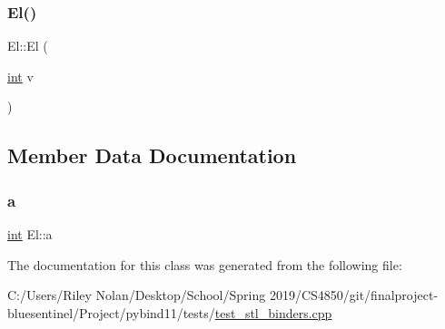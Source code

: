 \subsubsection{\texorpdfstring{El()}{El()}\hspace{0.1cm}{\footnotesize\ttfamily [2/2]}}
{\footnotesize\ttfamily El\+::\+El (\begin{DoxyParamCaption}\item[{\mbox{\hyperlink{warnings_8h_a74f207b5aa4ba51c3a2ad59b219a423b}{int}}}]{v }\end{DoxyParamCaption})\hspace{0.3cm}{\ttfamily [inline]}}



\subsection{Member Data Documentation}
\mbox{\label{class_el_a15afd3737e7710315fc5808f9188d0fe}} 
\subsubsection{\texorpdfstring{a}{a}}
{\footnotesize\ttfamily \mbox{\hyperlink{warnings_8h_a74f207b5aa4ba51c3a2ad59b219a423b}{int}} El\+::a}



The documentation for this class was generated from the following file\+:\begin{DoxyCompactItemize}
\item 
C\+:/\+Users/\+Riley Nolan/\+Desktop/\+School/\+Spring 2019/\+C\+S4850/git/finalproject-\/bluesentinel/\+Project/pybind11/tests/\mbox{\hyperlink{test__stl__binders_8cpp}{test\+\_\+stl\+\_\+binders.\+cpp}}\end{DoxyCompactItemize}
